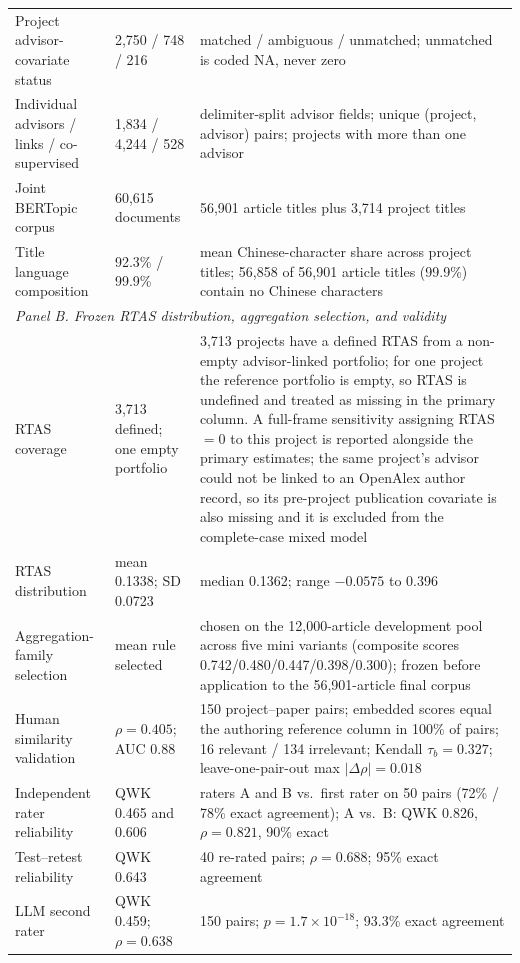 \begin{table}[H]
\begin{tabular}{p{1.55in}p{1.05in}p{3.15in}}
Project advisor-covariate status & 2,750 / 748 / 216 & matched / ambiguous / unmatched; unmatched is coded NA, never zero\\
Individual advisors / links / co-supervised & 1,834 / 4,244 / 528 & delimiter-split advisor fields; unique (project, advisor) pairs; projects with more than one advisor\\
Joint BERTopic corpus & 60,615 documents & 56,901 article titles plus 3,714 project titles\\
Title language composition & 92.3\% / 99.9\% & mean Chinese-character share across project titles; 56,858 of 56,901 article titles (99.9\%) contain no Chinese characters\\
\midrule
\multicolumn{3}{l}{\textit{Panel B. Frozen RTAS distribution, aggregation selection, and validity}}\\
\midrule
RTAS coverage & 3,713 defined; one empty portfolio & 3,713 projects have a defined RTAS from a non-empty advisor-linked portfolio; for one project the reference portfolio is empty, so RTAS is undefined and treated as missing in the primary column. A full-frame sensitivity assigning RTAS $=0$ to this project is reported alongside the primary estimates; the same project's advisor could not be linked to an OpenAlex author record, so its pre-project publication covariate is also missing and it is excluded from the complete-case mixed model\\
RTAS distribution & mean 0.1338; SD 0.0723 & median 0.1362; range $-0.0575$ to 0.396\\
Aggregation-family selection & mean rule selected & chosen on the 12,000-article development pool across five mini variants (composite scores 0.742/0.480/0.447/0.398/0.300); frozen before application to the 56,901-article final corpus\\
Human similarity validation & $\rho=0.405$; AUC 0.88 & 150 project--paper pairs; embedded scores equal the authoring reference column in 100\% of pairs; 16 relevant / 134 irrelevant; Kendall $\tau_b=0.327$; leave-one-pair-out max $|\Delta\rho|=0.018$\\
Independent rater reliability & QWK 0.465 and 0.606 & raters A and B vs.\ first rater on 50 pairs (72\% / 78\% exact agreement); A vs.\ B: QWK 0.826, $\rho=0.821$, 90\% exact\\
Test--retest reliability & QWK 0.643 & 40 re-rated pairs; $\rho=0.688$; 95\% exact agreement\\
LLM second rater & QWK 0.459; $\rho=0.638$ & 150 pairs; $p=1.7\times10^{-18}$; 93.3\% exact agreement\\

\end{tabular}
\end{table}
